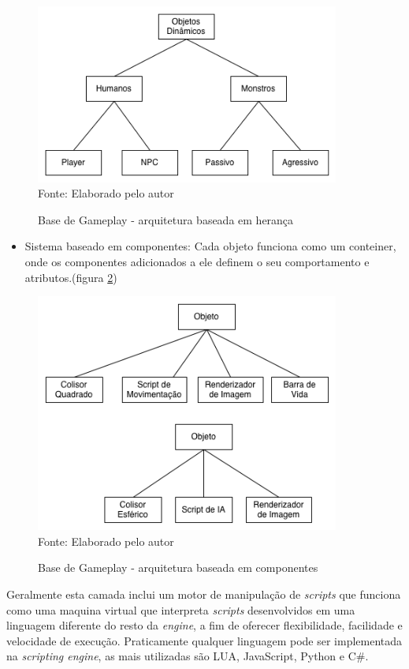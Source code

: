 \documentclass[12pt,	openright, twoside,	a4paper, english, french, spanish, brazil]{abntex2}
\begin{document}
\begin{figure}[H]
\centering
\caption{Base de Gameplay - arquitetura baseada em herança}
\includegraphics[width=10cm]{imagens/arch-heranca.png}
\\
\small{Fonte: Elaborado pelo autor}
\label{figura:arch_heranca}
\end{figure}

\begin{itemize}
\item Sistema baseado em componentes: Cada objeto funciona como um conteiner, onde os componentes adicionados a ele definem o seu comportamento e atributos.(figura \ref{figura:arch_comp})
\end{itemize}

\begin{figure}[H]
\centering
\caption{Base de Gameplay - arquitetura baseada em componentes}
\includegraphics[width=10cm]{imagens/arch-comp.png}
\\
\small{Fonte: Elaborado pelo autor}
\label{figura:arch_comp}
\end{figure}

Geralmente esta camada inclui um motor de manipulação de \textit{scripts} que funciona como uma maquina virtual que interpreta \textit{scripts} desenvolvidos em uma linguagem diferente do resto da \textit{engine}, a fim de oferecer flexibilidade, facilidade e velocidade de execução. Praticamente qualquer linguagem pode ser implementada na \textit{scripting engine}, as mais utilizadas são LUA, JavaScript, Python e C\#.
\end{document}
